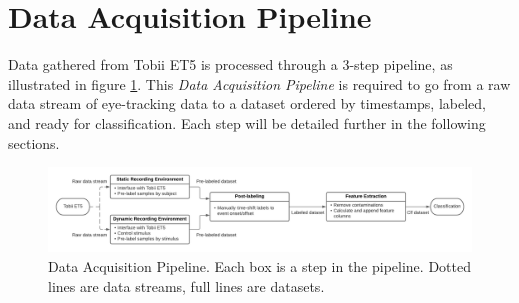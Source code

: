\section{Data Acquisition Pipeline} \label{sec:meth_DataAcquisitionPipeline}


Data gathered from Tobii ET5 is processed through a 3-step pipeline, as illustrated in figure \ref{fig:meth_DataAckPipeline}. This \textit{Data Acquisition Pipeline} is required to go from a raw data stream of eye-tracking data to a dataset ordered by timestamps, labeled, and ready for classification. Each step will be detailed further in the following sections.

\begin{figure}[h]
    \centering
    \includegraphics[width=\textwidth]{Images/meth_dataAckPipeline.png}
    \caption{Data Acquisition Pipeline. Each box is a step in the pipeline. Dotted lines are data streams, full lines are datasets.}
    \label{fig:meth_DataAckPipeline}
\end{figure}